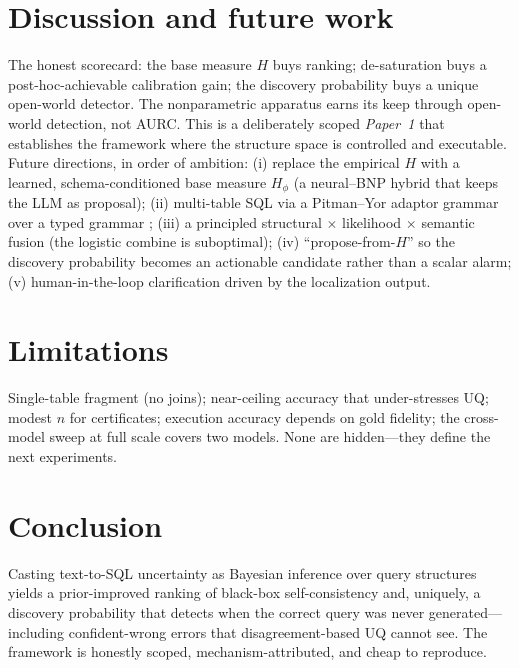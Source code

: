 \documentclass[11pt]{article}
\begin{document}
\section{Discussion and future work}

The honest scorecard: the base measure $H$ buys ranking; de-saturation buys a post-hoc-achievable
calibration gain; the discovery probability buys a unique open-world detector. The nonparametric
apparatus earns its keep through open-world detection, not AURC. This is a deliberately scoped
\emph{Paper~1} that establishes the framework where the structure space is controlled and
executable. Future directions, in order of ambition:
(i) replace the empirical $H$ with a learned, schema-conditioned base measure $H_\phi$ (a neural--BNP
hybrid that keeps the LLM as proposal);
(ii) multi-table SQL via a Pitman--Yor adaptor grammar over a typed grammar
\citep{johnson2007adaptor};
(iii) a principled structural $\times$ likelihood $\times$ semantic fusion (the logistic combine is
suboptimal);
(iv) ``propose-from-$H$'' so the discovery probability becomes an actionable candidate rather than a
scalar alarm;
(v) human-in-the-loop clarification driven by the localization output.

\section{Limitations}
Single-table fragment (no joins); near-ceiling accuracy that under-stresses UQ; modest $n$ for
certificates; execution accuracy depends on gold fidelity; the cross-model sweep at full scale covers
two models. None are hidden---they define the next experiments.

\section{Conclusion}
Casting text-to-SQL uncertainty as Bayesian inference over query structures yields a prior-improved
ranking of black-box self-consistency and, uniquely, a discovery probability that detects when the
correct query was never generated---including confident-wrong errors that disagreement-based UQ cannot
see. The framework is honestly scoped, mechanism-attributed, and cheap to reproduce.

\small


\end{document}
